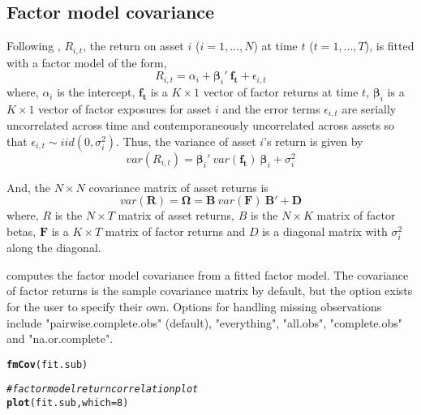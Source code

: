 \documentclass[a4paper]{article}\usepackage[]{graphicx}\usepackage[]{color}
\makeatletter
\newcommand{\hlnum}[1]{\textcolor[rgb]{0.686,0.059,0.569}{#1}}%
\newcommand{\hlcom}[1]{\textcolor[rgb]{0.678,0.584,0.686}{\textit{#1}}}%
\newcommand{\hlstd}[1]{\textcolor[rgb]{0.345,0.345,0.345}{#1}}%
\newcommand{\hlkwc}[1]{\textcolor[rgb]{0.333,0.667,0.333}{#1}}%
\newcommand{\hlkwd}[1]{\textcolor[rgb]{0.737,0.353,0.396}{\textbf{#1}}}%
\newenvironment{kframe}{%
 \def\at@end@of@kframe{}%
 \ifinner\ifhmode%
  \def\at@end@of@kframe{\end{minipage}}%
  \begin{minipage}{\columnwidth}%
 \fi\fi%
 \def\FrameCommand##1{\hskip\@totalleftmargin \hskip-\fboxsep
 \colorbox{shadecolor}{##1}\hskip-\fboxsep
     \hskip-\linewidth \hskip-\@totalleftmargin \hskip\columnwidth}%
 \MakeFramed {\advance\hsize-\width
   \@totalleftmargin\z@ \linewidth\hsize
   \@setminipage}}%
 {\par\unskip\endMakeFramed%
 \at@end@of@kframe}
\newenvironment{knitrout}{}{} %
\makeatother
\begin{document}
\subsection{Factor model covariance}

Following \citet{zivot2006modeling}, $R_{i, t}$, the return on asset $i$ ($i = 1, ..., N$) at time $t$ ($t = 1, ..., T$), is fitted with a factor model of the form,
\begin{equation}
R_{i,t} = \alpha_i + \bm\beta_i' \: \mathbf{f_t} + \epsilon_{i,t}
\end{equation}
where, $\alpha_i$ is the intercept, $\mathbf{f_t}$ is a $K \times 1$ vector of factor returns at time $t$, $\bm\beta_i$ is a $K \times 1$ vector of factor exposures for asset $i$ and the error terms $\epsilon_{i,t}$ are serially uncorrelated across time and contemporaneously uncorrelated across assets so that $\epsilon_{i,t} \sim iid(0, \sigma_i^2)$. Thus, the variance of asset $i$'s return is given by 
\begin{equation}
var(R_{i,t}) = \bm\beta_i'\: var(\mathbf{f_t})\: \bm\beta_i + \sigma_i^2
\end{equation}

And, the $N \times N$ covariance matrix of asset returns is
\begin{equation}
var(\mathbf{R}) = \bm\Omega = \mathbf{B}\: var(\mathbf{F})\: \mathbf{B}' + \mathbf{D}
\end{equation}
where, $R$ is the $N \times T$ matrix of asset returns, $B$ is the $N \times K$ matrix of factor betas, $\mathbf{F}$ is a $K \times T$ matrix of factor returns and $D$ is a diagonal matrix with $\sigma_i^2$ along the diagonal.

 computes the factor model covariance from a fitted factor model. The covariance of factor returns is the sample covariance matrix by default, but the option exists for the user to specify their own. Options for handling missing observations include "pairwise.complete.obs" (default), "everything", "all.obs", "complete.obs" and "na.or.complete".

\begin{knitrout}
\color{fgcolor}\begin{kframe}
\begin{alltt}
\hlkwd{fmCov}\hlstd{(fit.sub)}
\end{alltt}


{\ttfamily\noindent\bfseries{}}\begin{alltt}
\hlcom{# factor model return correlation plot}
\hlkwd{plot}\hlstd{(fit.sub,} \hlkwc{which}\hlstd{=}\hlnum{8}\hlstd{)}
\end{alltt}


{\ttfamily\noindent\bfseries\color{errorcolor}{\#\# Error in plot(fit.sub, which = 8): object 'fit.sub' not found}}\end{kframe}
\end{knitrout}
\end{document}
